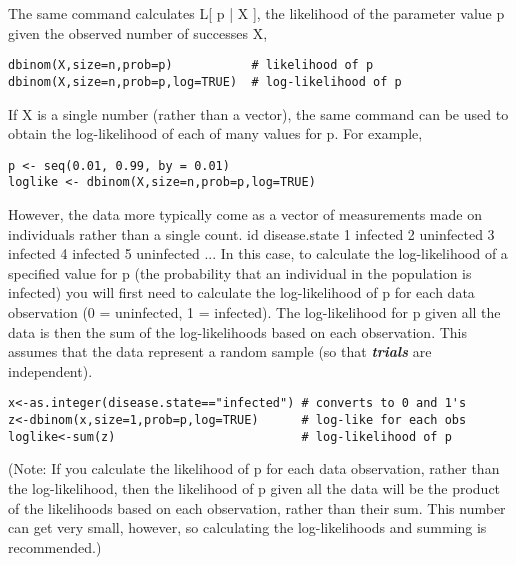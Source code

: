 \documentclass[12pt, a4paper]{article}
\theoremstyle{plain}
\theoremstyle{definition}
\theoremstyle{remark}
\begin{document}
The same command calculates L[ p | X ], the likelihood of the parameter value p given the observed number of successes X,

\begin{framed}
\begin{verbatim}
dbinom(X,size=n,prob=p)           # likelihood of p
dbinom(X,size=n,prob=p,log=TRUE)  # log-likelihood of p
\end{verbatim}
\end{framed}

If X is a single number (rather than a vector), the same command can be used to obtain the log-likelihood of each of many values for p. For example,
\begin{framed}
\begin{verbatim}
p <- seq(0.01, 0.99, by = 0.01)
loglike <- dbinom(X,size=n,prob=p,log=TRUE)
\end{verbatim}
\end{framed}

However, the data more typically come as a vector of measurements made on individuals rather than a single count.
id disease.state
1 infected
2 uninfected
3 infected
4 infected
5 uninfected
...
In this case, to calculate the log-likelihood of a specified value for p (the probability that an individual in the population is infected) you will first need to calculate the log-likelihood of p for each data observation (0 = uninfected, 1 = infected). The log-likelihood for p given all the data is then the sum of the log-likelihoods based on each observation. This assumes that the data represent a random sample (so that \textbf{\textit{trials}} are independent).

\begin{framed}
\begin{verbatim}
x<-as.integer(disease.state=="infected") # converts to 0 and 1's
z<-dbinom(x,size=1,prob=p,log=TRUE)      # log-like for each obs
loglike<-sum(z)                          # log-likelihood of p
\end{verbatim}
\end{framed}

(Note: If you calculate the likelihood of p for each data observation, rather than the log-likelihood, then the likelihood of p given all the data will be the product of the likelihoods based on each observation, rather than their sum. This number can get very small, however, so calculating the log-likelihoods and summing is recommended.)
\end{document}
